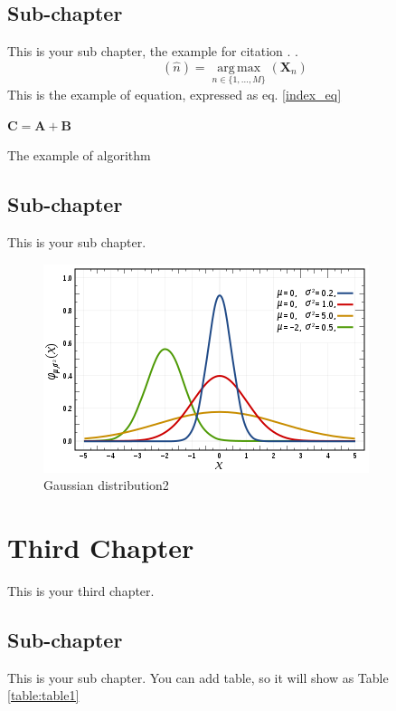\documentclass[12pt, twoside , openright]{book}
\begin{document}
	
	\section{Sub-chapter}\label{sub_chapter21}
	This is your sub chapter, the example for citation \cite{latexcompanion}. \blindtext[1].
	\begin{equation}
		\label{index_eq}
		(\hat{n})=\operatorname*{arg\,max}_{n\in \{1,\dots,M\}}(\mathbf{X}_{n})
	\end{equation}
	This is the example of equation, expressed as eq. \ref{index_eq}
	
	\begin{algorithm}
		$\mathbf{C}=\mathbf{A}+\mathbf{B}$
		
		\caption{The example of algorithm}
	\end{algorithm}
	
	
	\section{Sub-chapter}\label{sub_chapter22}
	This is your sub chapter. \blindtext[2]
	\begin{figure}[h]
		\centerline{\includegraphics[width=0.5\columnwidth]{Images/gambar.png}}
		\caption{Gaussian distribution2}
		\label{fig:figure_ref2}
	\end{figure}
	
	
	
	
	\chapter{Third Chapter}
	This is your third chapter. \blindtext[1] 
	
	\section{Sub-chapter}\label{sub_chapter31}
	This is your sub chapter. \blindtext[1] You can add table, so it will show as Table \ref{table:table1}
	
\end{document}
